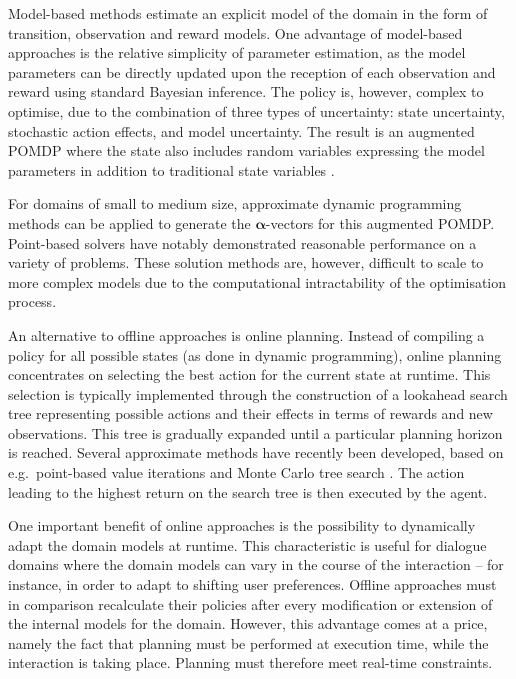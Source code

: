 Model-based methods estimate an explicit model of the domain in the form of transition, observation and reward models.  One advantage of model-based approaches is the relative simplicity of parameter estimation, as the model parameters can be directly updated upon the reception of each observation and reward using standard Bayesian inference. The policy is, however, complex to optimise, due to the combination of three types of uncertainty: state uncertainty, stochastic action effects, and model uncertainty. The result is an augmented POMDP where the state also includes random variables expressing the model parameters in addition to traditional state variables \citep{Duff:2002,Ross:2011}. 

For domains of small to medium size, approximate dynamic programming methods can be applied to generate the $\boldsymbol\alpha$-vectors for this augmented POMDP.  Point-based solvers \citep{Porta:2006,shani2013} have notably demonstrated reasonable performance on a variety of problems. These solution methods are, however, difficult to scale to more complex models due to the computational intractability of the optimisation process.    

An alternative to offline approaches is online planning.  Instead of compiling a policy for all possible states (as done in dynamic programming), online planning concentrates on selecting the best action for the current state at runtime. This selection is typically implemented through the construction of a lookahead search tree representing possible actions and their effects in terms of rewards and new observations. This tree is gradually expanded until a particular planning horizon is reached.  Several approximate methods have recently been developed, based on e.g.\ point-based value iterations \citep{ross2008} and Monte Carlo tree search \citep{NIPS2010_0740}. The action leading to the highest return on the search tree is then executed by the agent.  

One important benefit of online approaches is the possibility to dynamically adapt the domain models at runtime. This characteristic is useful for dialogue domains where the domain models can vary in the course of the interaction -- for instance, in order to adapt to shifting user preferences. Offline approaches must in comparison recalculate their policies after every modification or extension of the internal models for the domain.   However, this advantage comes at a price, namely the fact that planning must be performed at execution time, while the interaction is taking place.  Planning must therefore meet real-time constraints. 

